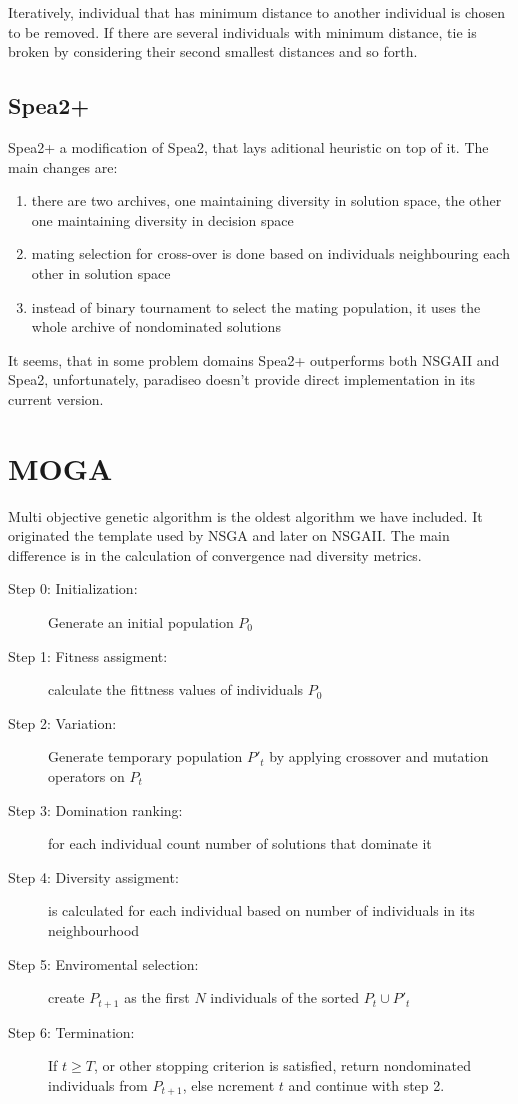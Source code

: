 \documentclass[12pt,oneside]{fithesis2}
\begin{document}
Iteratively, individual that has minimum distance to another individual is chosen to be removed. If there are several individuals with minimum distance, tie is broken by considering their second smallest distances and so forth. 

\subsection{Spea2+}
Spea2+ a modification of Spea2, that lays aditional heuristic on top of it. The main changes are:
\begin{enumerate}
	\item there are two archives, one maintaining diversity in solution space, the other one maintaining diversity in decision space
	\item mating selection for cross-over is done based on individuals neighbouring each other in solution space
	\item instead of binary tournament to select the mating population, it uses the whole archive of nondominated solutions
\end{enumerate}
It seems, that in some problem domains Spea2+ outperforms both NSGAII and Spea2, unfortunately, paradiseo doesn't provide direct implementation in its current version.

\section{MOGA}
Multi objective genetic algorithm is the oldest algorithm we have included. It originated the template used by NSGA and later on NSGAII. The main difference is in the calculation of convergence nad diversity metrics.

\begin{description}
	\item[Step 0: Initialization:] Generate an initial population $P_0$ 
	\item[Step 1: Fitness assigment:] calculate the fittness values of individuals $P_0$
	\item[Step 2: Variation:] Generate temporary population $P'_t$ by applying crossover and mutation operators on $P_t$
	\item[Step 3: Domination ranking:] for each individual count number of solutions that dominate it
	\item[Step 4: Diversity assigment:] is calculated for each individual based on number of individuals in its neighbourhood
	\item[Step 5: Enviromental selection:] create $P_{t+1}$ as the first $N$ individuals of the sorted $P_t \cup P'_t$
	\item[Step 6: Termination:] If $t \geq T$, or other stopping criterion is satisfied, return nondominated individuals from $P_{t+1}$, else ncrement $t$ and continue with step 2.
\end{description}
\end{document}
